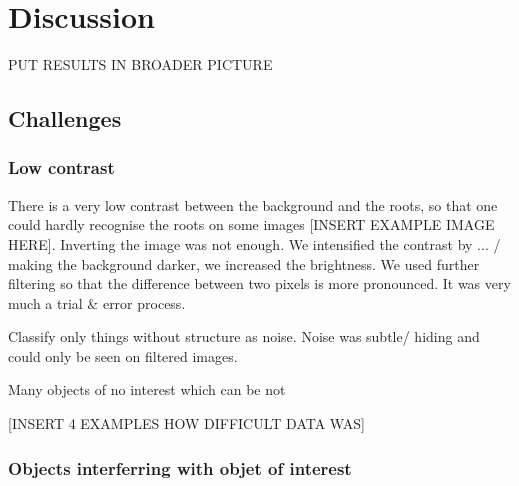 
\chapter{Discussion} %

\label{discussion} %

%


PUT RESULTS IN BROADER PICTURE


\section{Challenges}

\subsection{Low contrast}

There is a very low contrast between the background and the roots, so that one could hardly recognise the roots on some images [INSERT EXAMPLE IMAGE HERE].
Inverting the image was not enough. We intensified the contrast by ... / making the background darker, we increased the brightness. We used further filtering so that the difference between two pixels is more pronounced.
It was very much a trial \& error process.

Classify only things without structure as noise. 
Noise was subtle/ hiding and could only be seen on filtered images.

Many objects of no interest which can be not 


[INSERT 4 EXAMPLES HOW DIFFICULT DATA WAS]

\subsection{Objects interferring with objet of interest}

